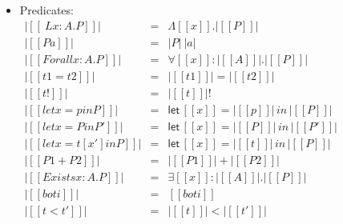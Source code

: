 \begin{definition}
\begin{itemize}
  \item Predicates:\\
    \begin{math}
      \begin{array}{lll}
        |[[\ L x : A . P]]|       & = & \Lambda [[x]] . |[[P]]|\\
        |[[P a]]|                 & = & |P|\ |a|\\
        |[[Forall x : A . P]]|    & = & \forall [[x]]:|[[A]]|.|[[P]]|\\
        |[[t1 = t2]]|             & = & |[[t1]]| = |[[t2]]|\\
        |[[t !]]|                 & = & |[[t]]|!\\
        |[[let x = p in P]]|      & = & \mathsf{let}\,[[x]] = |[[p]]|\,in\,|[[P]]|\\
        |[[let x = P in P']]|     & = & \mathsf{let}\,[[x]] = |[[P]]|\,in\,|[[P']]|\\
        |[[let x = t [x'] in P]]| & = & \mathsf{let}\,[[x]] = |[[t]]|\,in\,|[[P]]|\\
        |[[P1 + P2]]|             & = & |[[P1]]| + |[[P2]]|\\
        |[[Exists x : A . P]]|    & = & \exists [[x]]:|[[A]]|.|[[P]]|\\
        |[[bot i]]|               & = & [[bot i]]\\
        |[[t < t']]|              & = & |[[t]]| < |[[t']]|
      \end{array}
    \end{math}
    

\end{itemize}
\end{definition}
